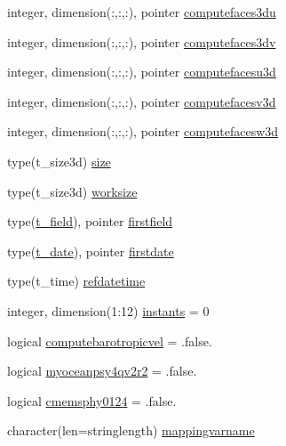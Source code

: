 \begin{DoxyCompactItemize}
\item 
integer, dimension(\+:,\+:,\+:), pointer \mbox{\hyperlink{structmodulemercatorformat_1_1t__mercatorformat_adddb04266000300722c4013ee010e6e2}{computefaces3du}}
\item 
integer, dimension(\+:,\+:,\+:), pointer \mbox{\hyperlink{structmodulemercatorformat_1_1t__mercatorformat_a42cbc859409e69bf972d4da7a708dd15}{computefaces3dv}}
\item 
integer, dimension(\+:,\+:,\+:), pointer \mbox{\hyperlink{structmodulemercatorformat_1_1t__mercatorformat_aa87ba3fdbfeab0a01d1a457e7d2bcb93}{computefacesu3d}}
\item 
integer, dimension(\+:,\+:,\+:), pointer \mbox{\hyperlink{structmodulemercatorformat_1_1t__mercatorformat_abae089aeab8e91c8e6b4e072536ae57e}{computefacesv3d}}
\item 
integer, dimension(\+:,\+:,\+:), pointer \mbox{\hyperlink{structmodulemercatorformat_1_1t__mercatorformat_a6e982b9c530f8a923e12dfd99f6cf62d}{computefacesw3d}}
\item 
type(t\+\_\+size3d) \mbox{\hyperlink{structmodulemercatorformat_1_1t__mercatorformat_a401fef8a890b642b6962d04ca09935a3}{size}}
\item 
type(t\+\_\+size3d) \mbox{\hyperlink{structmodulemercatorformat_1_1t__mercatorformat_ab35894edd4f764ec876875fdd39f13d0}{worksize}}
\item 
type(\mbox{\hyperlink{structmodulemercatorformat_1_1t__field}{t\+\_\+field}}), pointer \mbox{\hyperlink{structmodulemercatorformat_1_1t__mercatorformat_ad445b8c7c030980b4526eb90f83e01e0}{firstfield}}
\item 
type(\mbox{\hyperlink{structmodulemercatorformat_1_1t__date}{t\+\_\+date}}), pointer \mbox{\hyperlink{structmodulemercatorformat_1_1t__mercatorformat_a3d7bd67e0b57d4c5621bd982d68e69a1}{firstdate}}
\item 
type(t\+\_\+time) \mbox{\hyperlink{structmodulemercatorformat_1_1t__mercatorformat_ab320b2ca0f7792c6bfffee954fb1fdf1}{refdatetime}}
\item 
integer, dimension(1\+:12) \mbox{\hyperlink{structmodulemercatorformat_1_1t__mercatorformat_a640cb18881dba1448204eca1544bc05f}{instants}} = 0
\item 
logical \mbox{\hyperlink{structmodulemercatorformat_1_1t__mercatorformat_ade10392e6f66815e75725ccf480efd44}{computebarotropicvel}} = .false.
\item 
logical \mbox{\hyperlink{structmodulemercatorformat_1_1t__mercatorformat_a823579417c121f1226eead9ab51a61af}{myoceanpsy4qv2r2}} = .false.
\item 
logical \mbox{\hyperlink{structmodulemercatorformat_1_1t__mercatorformat_a925fa9f2b04ebb9a1d4948841eed0b8d}{cmemsphy0124}} = .false.
\item 
character(len=stringlength) \mbox{\hyperlink{structmodulemercatorformat_1_1t__mercatorformat_a8c6158c796da6a04286a277c2f1b6dcd}{mappingvarname}}
\end{DoxyCompactItemize}


